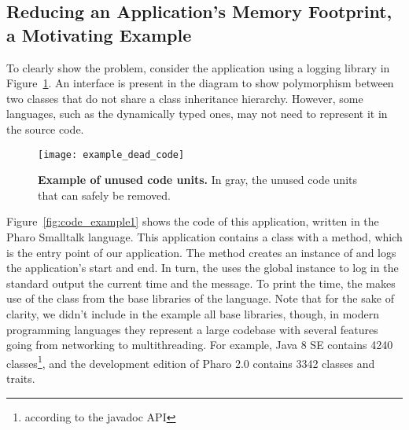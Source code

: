 \subsection{Reducing an Application's Memory Footprint, a Motivating Example} \label{sec:example_intro}

To clearly show the problem, consider the application using a logging library in Figure~\ref{fig:example_dead_code}.
An interface is present in the diagram to show polymorphism between two classes that do not share a class inheritance hierarchy. 
However, some languages, such as the dynamically typed ones, may not need to represent it in the source code.

\begin{figure}[ht]
\begin{center}
\texttt{[image: example\_dead\_code]}
\caption{\small\textbf{Example of unused code units.} In gray, the unused code units that can safely be removed.\label{fig:example_dead_code}}
\end{center}
\end{figure}

Figure~\ref{fig:code_example1} shows the code of this application, written in the Pharo Smalltalk language. This application contains a  class with a  method, which is the entry point of our application. The  method creates an instance of  and logs the application's start and end. In turn, the  uses the  global instance to log in the standard output the current time and the message. To print the time, the  makes use of the  class from the base libraries of the language. Note that for the sake of clarity, we didn't include in the example all base libraries, though, in modern programming languages they represent a large codebase with several features going from networking to multithreading. For example, Java 8 SE contains 4240 classes\footnote{according to the javadoc API}, and the development edition of Pharo 2.0 contains 3342 classes and traits.

